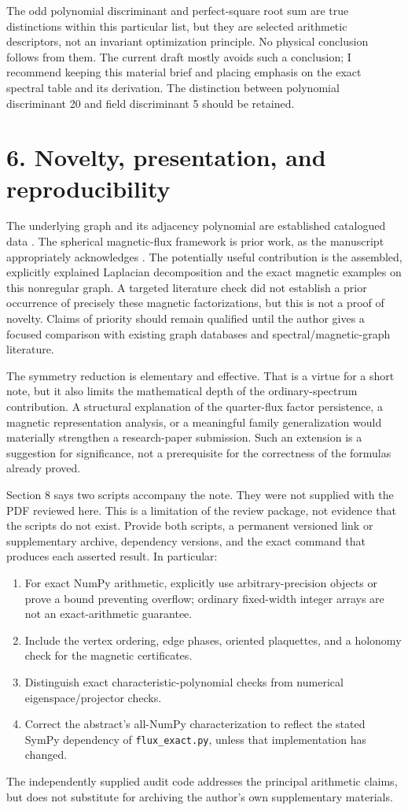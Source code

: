 \documentclass[11pt,a4paper]{article}
\begin{document}
The odd polynomial discriminant and perfect-square root sum are true distinctions within this particular list, but they are selected arithmetic descriptors, not an invariant optimization principle. No physical conclusion follows from them. The current draft mostly avoids such a conclusion; I recommend keeping this material brief and placing emphasis on the exact spectral table and its derivation. The distinction between polynomial discriminant 20 and field discriminant 5 should be retained.

\section*{6. Novelty, presentation, and reproducibility}
The underlying graph and its adjacency polynomial are established catalogued data \cite{mw}. The spherical magnetic-flux framework is prior work, as the manuscript appropriately acknowledges \cite{al}. The potentially useful contribution is the assembled, explicitly explained Laplacian decomposition and the exact magnetic examples on this nonregular graph. A targeted literature check did not establish a prior occurrence of precisely these magnetic factorizations, but this is not a proof of novelty. Claims of priority should remain qualified until the author gives a focused comparison with existing graph databases and spectral/magnetic-graph literature.

The symmetry reduction is elementary and effective. That is a virtue for a short note, but it also limits the mathematical depth of the ordinary-spectrum contribution. A structural explanation of the quarter-flux factor persistence, a magnetic representation analysis, or a meaningful family generalization would materially strengthen a research-paper submission. Such an extension is a suggestion for significance, not a prerequisite for the correctness of the formulas already proved.

Section 8 says two scripts accompany the note. They were not supplied with the PDF reviewed here. This is a limitation of the review package, not evidence that the scripts do not exist. Provide both scripts, a permanent versioned link or supplementary archive, dependency versions, and the exact command that produces each asserted result. In particular:
\begin{enumerate}
\item For exact NumPy arithmetic, explicitly use arbitrary-precision objects or prove a bound preventing overflow; ordinary fixed-width integer arrays are not an exact-arithmetic guarantee.
\item Include the vertex ordering, edge phases, oriented plaquettes, and a holonomy check for the magnetic certificates.
\item Distinguish exact characteristic-polynomial checks from numerical eigenspace/projector checks.
\item Correct the abstract's all-NumPy characterization to reflect the stated SymPy dependency of \texttt{flux\_exact.py}, unless that implementation has changed.
\end{enumerate}
The independently supplied audit code addresses the principal arithmetic claims, but does not substitute for archiving the author's own supplementary materials.
\end{document}
